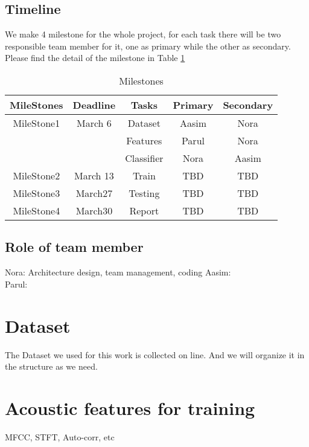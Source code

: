 \documentclass{article}
\begin{document}
\subsection{Timeline}\label{subsec:Timeline}
We make 4 milestone for the whole project, for each task there will be two responsible team member for it, one as primary while the other as secondary. Please find the detail of the milestone in Table \ref{table1}
\begin{table}[h]
 \begin{center}
\begin{tabular}{c|c|c|c|c}
        \toprule
         MileStones & Deadline & Tasks & Primary & Secondary  \\
       \midrule
        MileStone1 & March 6 & Dataset & Aasim & Nora \\
         &  & Features   & Parul & Nora \\
         &  & Classifier  & Nora & Aasim \\
        \midrule
        MileStone2 & March 13 & Train & TBD  &  TBD    \\
        \midrule
        MileStone3 & March27 & Testing & TBD &  TBD   \\
                \midrule
        MileStone4 & March30 & Report &TBD  & TBD    \\
        \bottomrule
\end{tabular}
\end{center}
 \caption{Milestones}
 \label{table1}
\end{table}


\subsection{Role of team member}\label{subsec:Role of team member}
Nora: Architecture design, team management, coding
Aasim:\\
Parul:\\

 
%
\section{Dataset}\label{sec:Dataset}
The Dataset we used for this work is collected on line. And we will organize it in the structure as we need.


\section{Acoustic features for training}\label{sec:features}
MFCC, STFT, Auto-corr, etc
\end{document}

